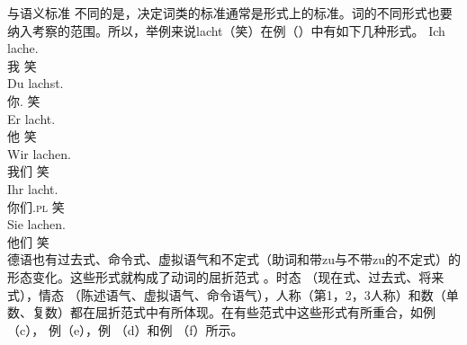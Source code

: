与语义标准 不同的是，决定词类的标准通常是形式上的标准。词的不同形式也要纳入考察的范围。所以，举例来说lacht（笑）在例（）中有如下几种形式。
\eal
\ex 
\gll Ich lache.\\
     我 笑\\
\ex 
\gll Du lachst.\\
     你.\sg{} 笑\\
\ex 
\gll Er lacht.\\
     他 笑\\
\ex 
\gll Wir lachen.\\
     我们 笑\\
\ex 
\gll Ihr lacht.\\
     你们.\textsc{pl} 笑\\
\ex 
\gll Sie lachen.\\
     他们 笑\\
\zl
德语也有过去式、命令式、虚拟语气和不定式（助词和带zu与不带zu的不定式）的形态变化。这些形式就构成了动词的屈折范式 。时态 （现在式、过去式、将来式），情态 （陈述语气、虚拟语气、命令语气），人称（第1，2，3人称）和数（单数、复数）都在屈折范式中有所体现。在有些范式中这些形式有所重合，如例（c）， 例（e），例 （d）和例 （f）所示。

